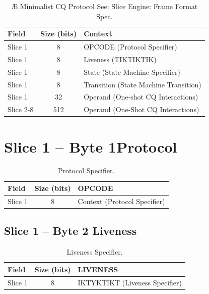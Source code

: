 \documentclass[../OAE-SPEC-MAIN.tex]{subfiles}
\begin{document}
\begin{table}[h]
\vspace{-10pt}
\begin{tabular}{|l|c|l|}
\hline
\textbf{Field} & \textbf{Size (bits)} & \textbf{Context} \\
\hline
Slice 1 & 8 & OPCODE (Protocol Specifier) \\
Slice 1 & 8 & Liveness  (TIKTIKTIK) \\
Slice 1 & 8 & State  (State Machine Specifier) \\
Slice 1 & 8 & Transition  (State Machine Transition) \\
Slice 1 & 32 & Operand (One-shot CQ Interactions) \\
\hline
Slice 2-8 & 512 & Operand (One-Shot CQ Interactions) \\
\hline
\end{tabular}
\caption{Æ Minimalist CQ Protocol See: Slice Engine: Frame Format Spec.}
\end{table}

\vspace{-10pt}
\section{Slice 1 -- Byte 1Protocol}

\begin{table}[h]
\vspace{-10pt}
\begin{tabular}{|l|c|l|}
\hline
\textbf{Field} & \textbf{Size (bits)} & \textbf{OPCODE} \\
\hline
Slice 1 & 8 & Context (Protocol Specifier) \\
\hline
\end{tabular}
\caption{Protocol Specifier.}
\end{table}

\vspace{-10pt}
\subsection{Slice 1 -- Byte 2 Liveness}

\begin{table}[h]
\vspace{-10pt}
\begin{tabular}{|l|c|l|}
\hline
\textbf{Field} & \textbf{Size (bits)} & \textbf{LIVENESS} \\
\hline
Slice 1 & 8 & IKTYKTIKT (Liveness Specifier)\\
\hline
\end{tabular}
\caption{Liveness Specifier.}
\end{table} 
\end{document}
